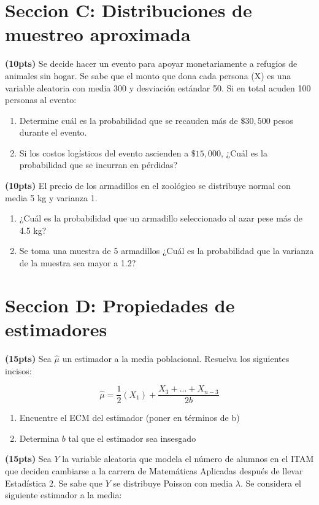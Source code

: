 \documentclass[addpoints]{exam}
\theoremstyle{mytheor}
\begin{document}
\begin{questions}
\section*{Seccion C: Distribuciones de muestreo aproximada}

\question \textbf{(10pts)} 
Se decide hacer un evento para apoyar monetariamente a refugios de animales sin hogar. Se sabe que el monto que dona cada persona (X) es una variable aleatoria con media 300 y desviación estándar 50. Si en total acuden 100 personas al evento:

\begin{enumerate}[label=\Alph*)]
\item Determine cuál es la probabilidad que se recauden más de $\$30,500$ pesos durante el evento.
\item Si los costos logísticos del evento ascienden a $\$15,000$, ¿Cuál es la probabilidad que se incurran en pérdidas?
\end{enumerate}

\question \textbf{(10pts)} El precio de los armadillos en el zoológico se distribuye normal con media 5 kg y varianza 1.

\begin{enumerate}[label=\Alph*)]
\item ¿Cuál es la probabilidad que un armadillo seleccionado al azar pese más de 4.5 kg?
\item Se toma una muestra de 5 armadillos ¿Cuál es la probabilidad que la varianza de la muestra sea mayor a 1.2?
\end{enumerate}
  

\section*{Seccion D: Propiedades de estimadores}

\question \textbf{(15pts)} Sea $\hat{\mu}$ un estimador a la media poblacional. Resuelva los siguientes incisos: 
   
$$\hat{\mu} = \frac{1}{2} (X_1) + \frac{X_3+...+X_{n-3}}{2b} $$

\begin{enumerate}[label=\Alph*)]
\item Encuentre el ECM del estimador (poner en términos de b)
\item Determina $b$ tal que el estimador sea insesgado
\end{enumerate}

\question \textbf{(15pts)} Sea $Y$ la variable aleatoria que modela el número de alumnos en el ITAM que deciden cambiarse a la carrera de Matemáticas Aplicadas después de llevar Estadística 2. Se sabe que $Y$ se distribuye Poisson con media $\lambda$. Se considera el siguiente estimador a la media:


\end{questions}
\end{document}
